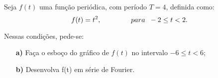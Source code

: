 \linespread{1.5}
Seja $f(t)$ uma função periódica, com período $T=4$, definida como:
\begin{equation*}
    f(t) = t^2, \hspace{1.5cm} para \hspace{0.2cm} -2 \leq t < 2.
\end{equation*}

Nessas condições, pede-se:
\begin{itemize}
    \item[\textbf{a)}] Faça o esboço do gráfico de $f(t)$ no intervalo $-6 \leq t < 6$;
    \item[\textbf{b)}] Desenvolva f(t) em série de Fourier.
\end{itemize}